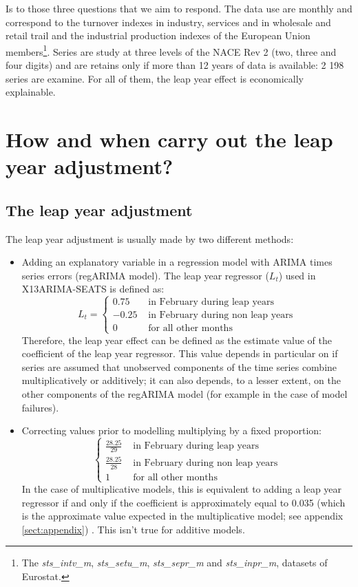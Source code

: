 \documentclass[]{article}
\providecommand{\tightlist}{%
  \setlength{\itemsep}{0pt}\setlength{\parskip}{0pt}}
\let\rmarkdownfootnote\footnote%
\def\footnote{\protect\rmarkdownfootnote}
\theoremstyle{definition}
\theoremstyle{definition}
\theoremstyle{definition}
\theoremstyle{remark}
\begin{document}
Is to those three questions that we aim to respond. The data use are
monthly and correspond to the turnover indexes in industry, services and
in wholesale and retail trail and the industrial production indexes of
the European Union members\footnote{The \emph{sts\_intv\_m},
  \emph{sts\_setu\_m}, \emph{sts\_sepr\_m} and \emph{sts\_inpr\_m},
  datasets of Eurostat.}. Series are study at three levels of the NACE
Rev 2 (two, three and four digits) and are retains only if more than 12
years of data is available: 2 198 series are examine. For all of them,
the leap year effect is economically explainable.

\section{How and when carry out the leap year
adjustment?}\label{how-and-when-carry-out-the-leap-year-adjustment}

\subsection{The leap year adjustment}\label{subsect:lyadj}

The leap year adjustment is usually made by two different methods:

\begin{itemize}
\tightlist
\item
  Adding an explanatory variable in a regression model with ARIMA times
  series errors (regARIMA model). The leap year regressor (\(L_t\)) used
  in X13ARIMA-SEATS is defined as: \[
  L_t = \begin{cases}
  0.75 & \text{ in February during leap years} \\
  -0.25  & \text{ in February during non leap years} \\
  0 & \text{ for all other months}
  \end{cases}
  \] Therefore, the leap year effect can be defined as the estimate
  value of the coefficient of the leap year regressor. This value
  depends in particular on if series are assumed that unobserved
  components of the time series combine multiplicatively or additively;
  it can also depends, to a lesser extent, on the other components of
  the regARIMA model (for example in the case of model failures).\\
\item
  Correcting values prior to modelling multiplying by a fixed
  proportion: \[\begin{cases}
  \frac{28.25}{29} & \text{ in February during leap years} \\
  \frac{28.25}{28}  & \text{ in February during non leap years} \\
  1 & \text{ for all other months}
  \end{cases}\] In the case of multiplicative models, this is equivalent
  to adding a leap year regressor if and only if the coefficient is
  approximately equal to 0.035 (which is the approximate value expected
  in the multiplicative model; see appendix \ref{sect:appendix})
  \citep{bell1992lengthmonthadj}. This isn't true for additive models.
\end{itemize}
\end{document}
